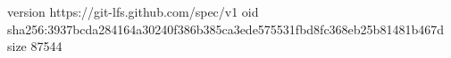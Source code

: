version https://git-lfs.github.com/spec/v1
oid sha256:3937bcda284164a30240f386b385ca3ede575531fbd8fc368eb25b81481b467d
size 87544
